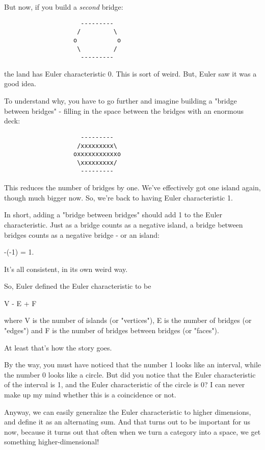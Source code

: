 But now, if you build a \emph{second} bridge:

\begin{verbatim}
                     --------- 
                    /         \
                   o           o
                    \         /
                     ---------
\end{verbatim}
    
the land has Euler characteristic 0.  This is sort of weird.  But, Euler
saw it was a good idea.

To understand why, you have to go further and imagine building a
"bridge between bridges" - filling in the space between the
bridges with an enormous deck:

\begin{verbatim}
                     --------- 
                    /xxxxxxxxx\
                   oxxxxxxxxxxxo
                    \xxxxxxxxx/
                     ---------
\end{verbatim}
    

This reduces the number of bridges by one.  We've effectively got one
island again, though much bigger now.  So, we're back to having Euler
characteristic 1.

In short, adding a "bridge between bridges" should add 1 to
the Euler characteristic.  Just as a bridge counts as a negative
island, a bridge between bridges counts as a negative bridge - or an
island:

-(-1) = 1.  

It's all consistent, in its own weird way.

So, Euler defined the Euler characteristic to be 

V - E + F

where V is the number of islands (or "vertices"), E is the
number of bridges (or "edges") and F is the number of
bridges between bridges (or "faces").

At least that's how the story goes.  

By the way, you must have noticed that the number 1 looks like an
interval, while the number 0 looks like a circle.  But did you notice
that the Euler characteristic of the interval is 1, and the Euler 
characteristic of the circle is 0?  I can never make up my mind whether
this is a coincidence or not.  

Anyway, we can easily generalize the Euler characteristic to higher
dimensions, and define it as an alternating sum.  And that turns out
to be important for us now, because it turns out that often when we
turn a category into a space, we get something higher-dimensional!

